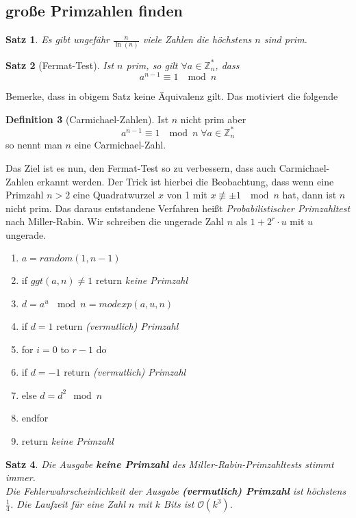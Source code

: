 \documentclass[a4paper, 12pt]{article}
\theoremstyle{plain}
\newtheorem{theorem}{Satz}[subsection] %
\theoremstyle{definition}
\newtheorem{definition}[theorem]{Definition} %
\theoremstyle{lemma}
\theoremstyle{remark}
\theoremstyle{corollary}
\theoremstyle{example}
\begin{document}
	\subsection{große Primzahlen finden}
	\begin{theorem}
		Es gibt ungefähr $\frac{n}{\ln(n)}$ viele Zahlen die höchstens $n$ sind prim.
	\end{theorem}
	\begin{theorem}[Fermat-Test]
		Ist $n$ prim, so gilt $\forall a \in \mathbb{Z}_n^*$, dass \[a^{n-1} \equiv 1 \; \mod n\]
	\end{theorem}
	Bemerke, dass in obigem Satz keine Äquivalenz gilt. Das motiviert die folgende
	\begin{definition}[Carmichael-Zahlen]
		Ist $n$ nicht prim aber \[a^{n-1} \equiv 1 \; \mod n \; \forall a \in \mathbb{Z}_n^*\] so nennt man $n$ eine Carmichael-Zahl.
	\end{definition}
	Das Ziel ist es nun, den Fermat-Test so zu verbessern, dass auch Carmichael-Zahlen erkannt werden. Der Trick ist hierbei die Beobachtung, dass wenn eine Primzahl $n>2$ eine Quadratwurzel $x$ von 1 mit $x \not \equiv \pm 1 \; \mod n$ hat, dann ist $n$ nicht prim. Das daraus entstandene Verfahren heißt \textit{Probabilistischer Primzahltest} nach Miller-Rabin. Wir schreiben die ungerade Zahl $n$ als $1+2^r\cdot u$ mit $u$ ungerade.
	\begin{enumerate}
		\item $a = random(1,n-1)$
		\item if $ggt(a,n) \neq 1$ return \textit{keine Primzahl}
		\item $d = a^u \, \mod n = modexp(a,u,n)$
		\item if $d=1$ return \textit{(vermutlich) Primzahl}
		\item for $i=0$ to $r-1$ do
		\item if $d=-1$ return \textit{(vermutlich) Primzahl}
		\item else $d=d^2 \mod n$
		\item endfor
		\item return \textit{keine Primzahl}
	\end{enumerate}
	\begin{theorem}
		Die Ausgabe \textbf{keine Primzahl} des Miller-Rabin-Primzahltests stimmt immer.\\
		Die Fehlerwahrscheinlichkeit der Ausgabe \textbf{(vermutlich) Primzahl} ist höchstens $\frac{1}{4}$. Die Laufzeit für eine Zahl $n$ mit $k$ Bits ist $\mathcal{O}(k^3)$.
	\end{theorem}
\end{document}
